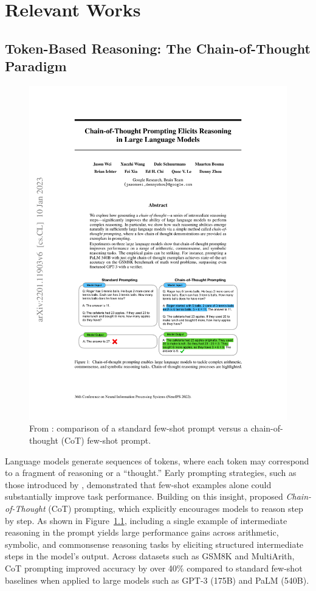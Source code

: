 \documentclass[project]{bsu-cs}  %
\begin{document}
\chapter{Relevant Works}\label{ch:works}
%
%
\section{Token-Based Reasoning: The Chain-of-Thought Paradigm}\label{sec:CoT}
% 
\begin{figure}
    \centering
    \includegraphics[width=0.8\linewidth]{figures/cot1.pdf}
    \caption{From \citet{DBLP:journals/corr/abs-2201-11903}: comparison of a standard few-shot prompt versus a chain-of-thought (CoT) few-shot prompt.}
    \label{fig:cot1}
\end{figure}
% 
Language models generate sequences of tokens, where each token may correspond to a fragment of reasoning or a “thought.” Early prompting strategies, such as those introduced by \citet{DBLP:journals/corr/abs-2005-14165}, demonstrated that few-shot examples alone could substantially improve task performance. Building on this insight, \citet{DBLP:journals/corr/abs-2201-11903} proposed \textit{Chain-of-Thought} (CoT) prompting, which explicitly encourages models to reason step by step. As shown in Figure~\ref{fig:cot1}, including a single example of intermediate reasoning in the prompt yields large performance gains across arithmetic, symbolic, and commonsense reasoning tasks by eliciting structured intermediate steps in the model’s output. Across datasets such as GSM8K and MultiArith, CoT prompting improved accuracy by over 40\% compared to standard few-shot baselines when applied to large models such as GPT-3 (175B) and PaLM (540B).
\end{document}
